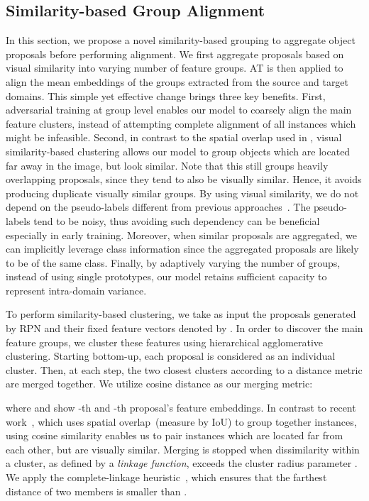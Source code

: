 \documentclass[10pt,twocolumn,letterpaper]{article}
\begin{document}
\subsection{Similarity-based Group Alignment} 
\label{sec:visga}
In this section, we propose a novel similarity-based grouping to aggregate object proposals before performing alignment.
We first aggregate proposals based on visual similarity into varying number of feature groups.
AT is then applied to align the mean embeddings of the groups extracted from the source and target domains. 
This simple yet effective change brings three key benefits. 
First, adversarial training at group level enables our model to coarsely align the main feature clusters, instead of attempting complete alignment of all instances which might be infeasible.
Second, in contrast to the spatial overlap used in \cite{GPA, zhu_cvpr19_selective_alignment}, visual similarity-based clustering allows our model to group objects which are located far away in the image, but look similar. 
Note that this still groups heavily overlapping proposals, since they tend to also be visually similar. Hence, it avoids producing duplicate visually similar groups.
By using visual similarity, we do not depend on the pseudo-labels different from  previous approaches~\cite{GPA, zheng_cvpr20_prototype}.  
The pseudo-labels tend to be noisy,   thus avoiding such dependency can be beneficial especially in early training.
Moreover, when similar proposals are aggregated, we can implicitly leverage class information since the aggregated proposals are likely to be of the same class. 
Finally, by adaptively varying the number of groups, instead of using single prototypes, our model retains sufficient capacity to represent intra-domain variance. 



 To perform similarity-based clustering, we take as input the  proposals generated by RPN and their fixed feature vectors denoted by .
In order to discover the main feature groups, we cluster these features using  hierarchical agglomerative clustering. Starting bottom-up, each proposal is considered as an individual cluster. Then, at each step, the two closest clusters according to a distance metric are merged together. We utilize cosine distance as our merging metric:

\noindent where  and  show -th and -th proposal's feature embeddings. In contrast to recent work~\cite{GPA}, which uses spatial overlap~(measure by IoU) to group together instances, using cosine similarity enables us to pair instances which are located far from each other, but are visually similar. Merging is stopped when dissimilarity within a cluster, as defined by a \emph{linkage function}, exceeds the cluster radius parameter . We apply the complete-linkage heuristic~\cite{defays1977efficient}, which ensures that the farthest distance of two members is smaller than .
\end{document}
